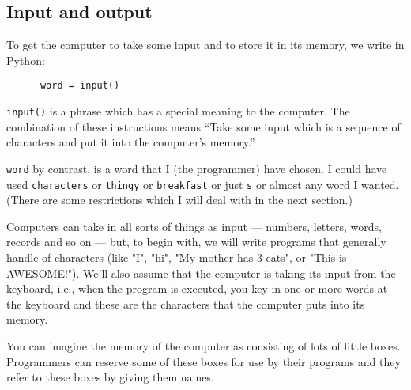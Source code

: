 \subsection{Input and output}


To get the computer to take some input  and to store it
in its memory, we write in Python:

\begin{Verbatim}
      word = input()
\end{Verbatim}

\verb!input()!
is a phrase which has a special meaning to
the computer. The combination of these instructions
means
``Take some input which is a sequence of characters and put it into the computer's memory.''

\verb!word! by contrast, is a word that I (the programmer) have chosen.
I could have used \verb!characters! or \verb!thingy! or \verb!breakfast!
or just \verb!s! or almost any word I wanted. (There are some
restrictions which I will deal with in the next section.)  

Computers can take in all sorts of things as input --- numbers,
letters, words, records and so on --- but, to begin with, we will
write programs that generally handle
 of characters (like
"I", "hi", "My mother has 3 cats", or "This is AWESOME!").
We'll also assume that the computer is taking its input from the
keyboard, i.e., when the program is executed, you key in one or more
words at the keyboard and these are the characters that the computer 
puts into its memory.

You can imagine the memory of the computer as consisting of lots of
little boxes.  Programmers can reserve some of these boxes for
use by their programs and they refer to these boxes by giving
them names.  

